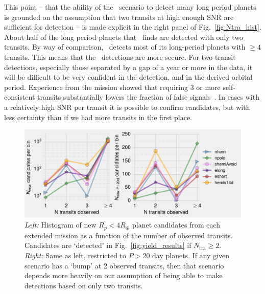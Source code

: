\begin{enumerate}
	This point -- that the ability of the \hemis\ scenario to detect many long period planets is grounded on the assumption that two transits at high enough SNR are sufficient for detection -- is made explicit in the right panel of Fig.~\ref{fig:Ntra_hist}.
	About half of the long period planets that \hemis\ finds are detected with only two transits.
	By way of comparison, \npole\ detects most of its long-period planets with $\ge 4$ transits.
	This means that the \npole\ detections are more secure.
	For two-transit detections, especially those separated by a gap of a year or more in the \tess data, it will be
        difficult to be very confident in the detection, and in the derived orbital period.
        Experience from the \kepler mission showed that requiring 3 or more self-consistent transits substantially lowers the fraction of false signals~\citep{burke_Q1Q8_2014}.
	In cases with a relatively high SNR per transit it is possible to confirm candidates, but with less certainty than if we had more transits in the first place.
	\begin{figure}[!t]
		\centering
		\includegraphics[scale=1.]{figures/Ntra_histogram.pdf}
		\caption{ \textit{Left:} Histogram of new $R_p<4R_\oplus$ planet candidates from each extended mission as a function of the number of observed transits.
		Candidates are `detected' in Fig.~\protect\ref{fig:yield_results} if $N_\mathrm{tra}\geq2$.
		\textit{Right:} Same as left, restricted to $P>20$ day planets.
		If any given scenario has a `bump' at 2 observed transits, then that scenario depends more heavily on our assumption of being able to make detections based on only two transits.
}
\end{figure}
\end{enumerate}
